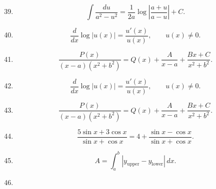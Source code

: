 \begin{enumerate}[label=\theenumi,leftmargin=4mm,itemsep=4pt]
\setcounter{enumi}{38}\item

\begin{equation}
\int\frac{du}{a^2-u^2}
=\frac1{2a}\log\left|\frac{a+u}{a-u}\right|+C.
\label{eq:int-rational-39}
\end{equation}

\setcounter{enumi}{39}\item

\begin{equation}
\frac{d}{dx}\log|u(x)|=\frac{u'(x)}{u(x)},\qquad u(x)\ne0.
\label{eq:log-derivative-40}
\end{equation}

\setcounter{enumi}{40}\item

\begin{equation}
\frac{P(x)}{(x-a)(x^2+b^2)}
=Q(x)+\frac{A}{x-a}+\frac{Bx+C}{x^2+b^2}.
\label{eq:partial-fractions-41}
\end{equation}

\setcounter{enumi}{41}\item

\begin{equation}
\frac{d}{dx}\log|u(x)|=\frac{u'(x)}{u(x)},\qquad u(x)\ne0.
\label{eq:log-derivative-42}
\end{equation}

\setcounter{enumi}{42}\item

\begin{equation}
\frac{P(x)}{(x-a)(x^2+b^2)}
=Q(x)+\frac{A}{x-a}+\frac{Bx+C}{x^2+b^2}.
\label{eq:partial-fractions-43}
\end{equation}

\setcounter{enumi}{43}\item

\begin{equation}
\frac{5\sin x+3\cos x}{\sin x+\cos x}
=4+\frac{\sin x-\cos x}{\sin x+\cos x}.
\label{eq:trig-split-44}
\end{equation}

\setcounter{enumi}{45}\item

\begin{equation}
A=\int_a^b|y_{\mathrm{upper}}-y_{\mathrm{lower}}|\,dx.
\label{eq:area-between-46}
\end{equation}

\setcounter{enumi}{46}\item


\end{enumerate}
